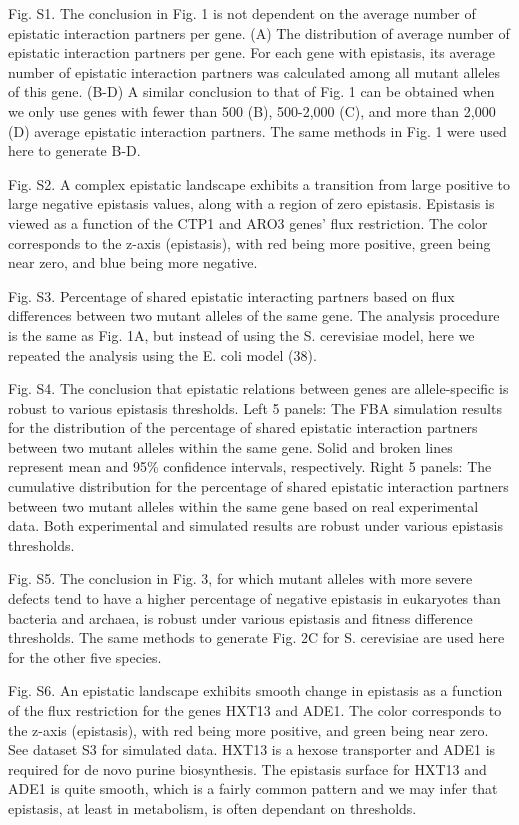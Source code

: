 Fig. S1. The conclusion in Fig. 1 is not dependent on the average
number of epistatic interaction partners per gene. (A) The
distribution of average number of epistatic interaction partners per
gene. For each gene with epistasis, its average number of epistatic
interaction partners was calculated among all mutant alleles of this
gene. (B-D) A similar conclusion to that of Fig. 1 can be obtained
when we only use genes with fewer than 500 (B), 500-2,000 (C), and
more than 2,000 (D) average epistatic interaction partners. The same
methods in Fig. 1 were used here to generate B-D.

Fig. S2. A complex epistatic landscape exhibits a transition from
large positive to large negative epistasis values, along with a region
of zero epistasis. Epistasis is viewed as a function of the CTP1 and
ARO3 genes’ flux restriction. The color corresponds to the z-axis
(epistasis), with red being more positive, green being near zero, and
blue being more negative.

Fig. S3. Percentage of shared epistatic interacting partners based on
flux differences between two mutant alleles of the same gene. The
analysis procedure is the same as Fig. 1A, but instead of using the
S. cerevisiae model, here we repeated the analysis using the E. coli
model (38).

Fig. S4. The conclusion that epistatic relations between genes are
allele-specific is robust to various epistasis thresholds. Left 5
panels: The FBA simulation results for the distribution of the
percentage of shared epistatic interaction partners between two mutant
alleles within the same gene. Solid and broken lines represent mean
and 95\% confidence intervals, respectively. Right 5 panels: The
cumulative distribution for the percentage of shared epistatic
interaction partners between two mutant alleles within the same gene
based on real experimental data. Both experimental and simulated
results are robust under various epistasis thresholds.

Fig. S5. The conclusion in Fig. 3, for which mutant alleles with more
severe defects tend to have a higher percentage of negative epistasis
in eukaryotes than bacteria and archaea, is robust under various
epistasis and fitness difference thresholds. The same methods to
generate Fig. 2C for S. cerevisiae are used here for the other five
species.

Fig. S6. An epistatic landscape exhibits smooth change in epistasis as
a function of the flux restriction for the genes HXT13 and ADE1. The
color corresponds to the z-axis (epistasis), with red being more
positive, and green being near zero. See dataset S3 for simulated
data. HXT13 is a hexose transporter and ADE1 is required for de novo
purine biosynthesis. The epistasis surface for HXT13 and ADE1 is quite
smooth, which is a fairly common pattern and we may infer that
epistasis, at least in metabolism, is often dependant on thresholds.

